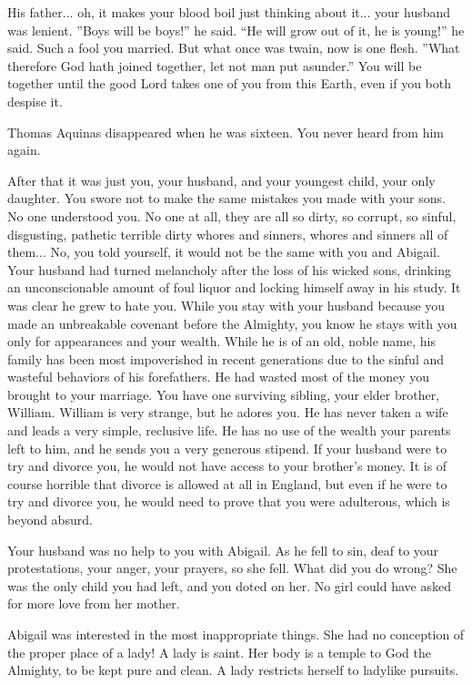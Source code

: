 \documentclass[char]{airship}
\begin{document}
His father... oh, it makes your blood boil just thinking about
it... your husband was lenient. ''Boys will be boys!'' he said. ``He
will grow out of it, he is young!'' he said. Such a fool you
married. But what once was twain, now is one flesh.  ''What therefore
God hath joined together, let not man put asunder.'' You will be
together until the good Lord takes one of you from this Earth, even if
you both despise it.

Thomas Aquinas disappeared when he was sixteen. You never heard from
him again. 

After that it was just you, your husband, and your youngest child,
your only daughter. You swore not to make the same mistakes you made
with your sons. No one understood you. No one at all, they are all so
dirty, so corrupt, so sinful, disgusting, pathetic terrible dirty
whores and sinners, whores and sinners all of them... No, you told
yourself, it would not be the same with you and Abigail. Your husband
had turned melancholy after the loss of his wicked sons, drinking an
unconscionable amount of foul liquor and locking himself away in his
study. It was clear he grew to hate you. While you stay with your
husband because you made an unbreakable covenant before the Almighty,
you know he stays with you only for appearances and your wealth. While
he is of an old, noble name, his family has been most impoverished in
recent generations due to the sinful and wasteful behaviors of his
forefathers. He had wasted most of the money you brought to your
marriage. You have one surviving sibling, your elder brother,
William. William is very strange, but he adores you. He has never
taken a wife and leads a very simple, reclusive life. He has no use of
the wealth your parents left to him, and he sends you a very generous
stipend. If your husband were to try and divorce you, he would not
have access to your brother's money. It is of course horrible that
divorce is allowed at all in England, but even if he were to try and
divorce you, he would need to prove that you were adulterous, which is
beyond absurd.

Your husband was no help to you with Abigail. As he fell to sin, deaf
to your protestations, your anger, your prayers, so she fell. What did
you do wrong? She was the only child you had left, and you doted on
her. No girl could have asked for more love from her mother.

Abigail was interested in the most inappropriate things. She had no
conception of the proper place of a lady! A lady is saint. Her body is
a temple to God the Almighty, to be kept pure and clean. A lady
restricts herself to ladylike pursuits.
\end{document}
